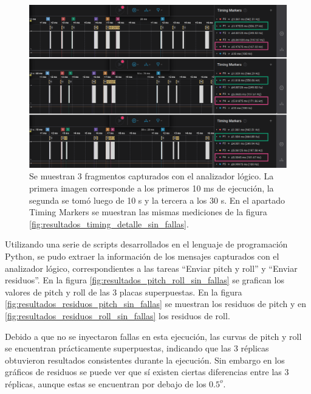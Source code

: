 \begin{figure}[htb]
    \centering
    \includegraphics[width=\textwidth]{img/resultados_timing_detalle_placa_3_no_sync.png}
    \caption{Se muestran 3 fragmentos capturados con el analizador lógico. La primera imagen corresponde a los primeros 10 ms de ejecución, la segunda se tomó luego de 10 s y la tercera a los 30 s. En el apartado Timing Markers se muestran las mismas mediciones de la figura \ref{fig:resultados_timing_detalle_sin_fallas}.}
    \label{fig:resultados_timing_detalle_placa_3_no_sync}
\end{figure}

Utilizando una serie de scripts desarrollados en el lenguaje de programación Python, se pudo extraer la información de los mensajes capturados con el analizador lógico, correspondientes a las tareas ``Enviar pitch y roll'' y ``Enviar residuos''. En la figura \ref{fig:resultados_pitch_roll_sin_fallas} se grafican los valores de pitch y roll de las 3 placas superpuestas. En la figura \ref{fig:resultados_residuos_pitch_sin_fallas} se muestran los residuos de pitch y en \ref{fig:resultados_residuos_roll_sin_fallas} los residuos de roll.

Debido a que no se inyectaron fallas en esta ejecución, las curvas de pitch y roll se encuentran prácticamente superpuestas, indicando que las 3 réplicas obtuvieron resultados consistentes durante la ejecución. Sin embargo en los gráficos de residuos se puede ver que sí existen ciertas diferencias entre las 3 réplicas, aunque estas se encuentran por debajo de los $0.5^{o}$.

